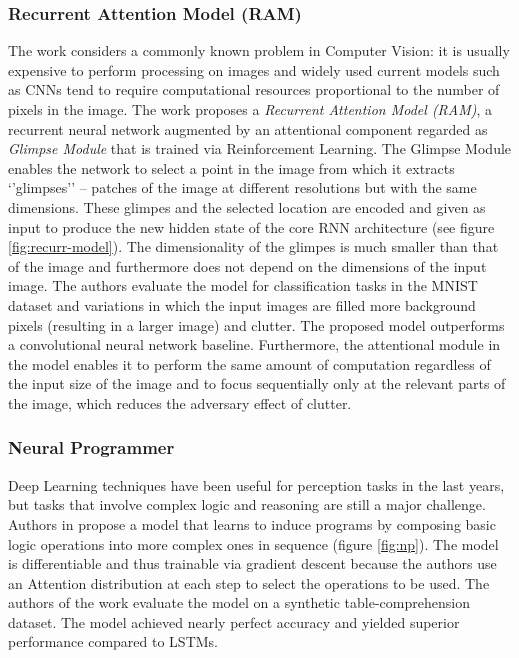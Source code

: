 \documentclass[12pt]{article}
\begin{document}
\subsubsection{Recurrent Attention Model (RAM)}
The work \cite{ref:rec-models} considers a commonly known problem in Computer Vision: it is usually
expensive to perform processing on images and widely used current models such as
CNNs tend to require computational resources proportional to the number of pixels in the image.
The work proposes a \emph{Recurrent Attention Model (RAM)}, a recurrent neural network augmented by
an attentional component regarded as \emph{Glimpse Module} that is trained via Reinforcement Learning.
The Glimpse Module enables the network to select a point in the image from which it extracts `'glimpses''
-- patches of the image at different resolutions but with the same dimensions.
These glimpes and the selected location are encoded and given as input to produce
the new hidden state of the core RNN architecture (see figure \ref{fig:recurr-model}).
The dimensionality of the glimpes is much smaller than that of the image and furthermore does not depend
on the dimensions of the input image.
The authors evaluate the model for classification tasks in the MNIST~\cite{ref:mnist} dataset and variations
in which the input images are filled more background pixels (resulting in a larger image) and clutter.
The proposed model outperforms a convolutional neural network baseline.
Furthermore, the attentional module in the model enables it to perform the same amount of computation
regardless of the input size of the image and to focus sequentially only at the relevant parts of the image,
which reduces the adversary effect of clutter.

\subsubsection{Neural Programmer}
Deep Learning techniques have been useful for perception tasks in the last years, but tasks that involve
complex logic and reasoning are still a major challenge.
Authors in \cite{ref:np} propose a model that learns to induce programs by composing basic logic operations
into more complex ones in sequence (figure \ref{fig:np}).
The model is differentiable and thus trainable via gradient descent because the authors use an Attention
distribution at each step to select the operations to be used.
The authors of the work evaluate the model on a synthetic table-comprehension dataset.
The model achieved nearly perfect accuracy and yielded superior performance compared to LSTMs.
\end{document}
